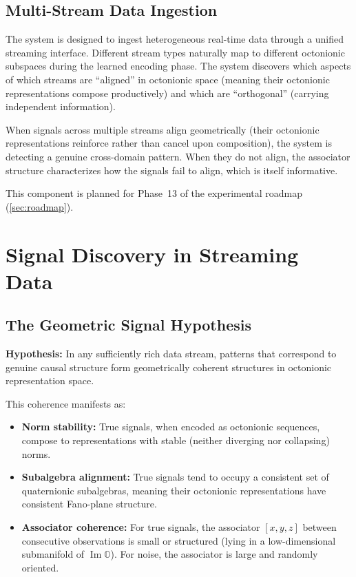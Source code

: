 \documentclass[11pt,a4paper]{article}
\DeclareMathOperator{\Ima}{Im}
\newcommand{\Oct}{\mathbb{O}}
\begin{document}
\subsection{Multi-Stream Data Ingestion}

The system is designed to ingest heterogeneous real-time data through a unified streaming interface. Different stream types naturally map to different octonionic subspaces during the learned encoding phase. The system discovers which aspects of which streams are ``aligned'' in octonionic space (meaning their octonionic representations compose productively) and which are ``orthogonal'' (carrying independent information).

When signals across multiple streams align geometrically (their octonionic representations reinforce rather than cancel upon composition), the system is detecting a genuine cross-domain pattern. When they do not align, the associator structure characterizes how the signals fail to align, which is itself informative.

This component is planned for Phase~13 of the experimental roadmap (\cref{sec:roadmap}).

\section{Signal Discovery in Streaming Data}
\label{sec:signals}

\subsection{The Geometric Signal Hypothesis}

\textbf{Hypothesis:} In any sufficiently rich data stream, patterns that correspond to genuine causal structure form geometrically coherent structures in octonionic representation space.

This coherence manifests as:
\begin{itemize}[nosep]
  \item \textbf{Norm stability:} True signals, when encoded as octonionic sequences, compose to representations with stable (neither diverging nor collapsing) norms.
  \item \textbf{Subalgebra alignment:} True signals tend to occupy a consistent set of quaternionic subalgebras, meaning their octonionic representations have consistent Fano-plane structure.
  \item \textbf{Associator coherence:} For true signals, the associator $[x,y,z]$ between consecutive observations is small or structured (lying in a low-dimensional submanifold of $\Ima\Oct$). For noise, the associator is large and randomly oriented.
\end{itemize}
\end{document}
